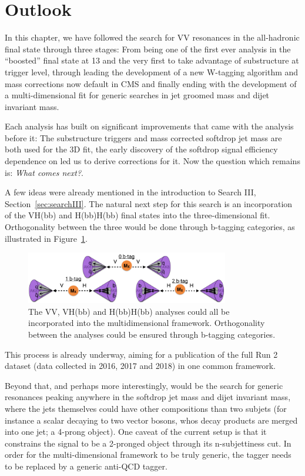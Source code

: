 \clearpage

\section{Outlook}
\label{sec:outlook}
In this chapter, we have followed the search for VV resonances in the all-hadronic final state through three stages: From being one of the first ever analysis in the ``boosted'' final state at 13 \TeV and the very first to take advantage of substructure at trigger level, through leading the development of a new W-tagging algorithm and mass corrections now default in CMS and finally ending with the development of a multi-dimensional fit for generic searches in jet groomed mass and dijet invariant mass.\par
Each analysis has built on significant improvements that came with the analysis before it: The substructure triggers and mass corrected softdrop jet mass are both used for the 3D fit, the early discovery of the softdrop signal efficiency dependence on \PT led us to derive corrections for it. Now the question which remains is: \emph{What comes next?}.\par
A few ideas were already mentioned in the introduction to Search III, Section~\ref{sec:searchIII}. The natural next step for this search is an incorporation of the VH(bb) and H(bb)H(bb) final states into the three-dimensional fit. Orthogonality between the three would be done through b-tagging categories, as illustrated in Figure~\ref{fig:outlook:vvvhhh}.
\begin{figure}[h!]
\centering
\includegraphics[width=0.79\textwidth]{figures/analysis/search3/misc/VVVHHH.png}
\caption{The VV, VH(bb) and H(bb)H(bb) analyses could all be incorporated into the multidimensional framework. Orthogonality between the analyses could be ensured through b-tagging categories.}
\label{fig:outlook:vvvhhh}
\end{figure}
This process is already underway, aiming for a publication of the full Run 2 dataset (data collected in 2016, 2017 and 2018) in one common framework.\par
Beyond that, and perhaps more interestingly, would be the search for generic resonances peaking anywhere in the softdrop jet mass and dijet invariant mass, where the jets themselves could have other compositions than two subjets (for instance a scalar decaying to two vector bosons, whos decay products are merged into one jet; a 4-prong object). One caveat of the current setup is that it constrains the signal to be a 2-pronged object through its n-subjettiness cut. In order for the multi-dimensional framework to be truly generic, the tagger needs to be replaced by a generic anti-QCD tagger.

